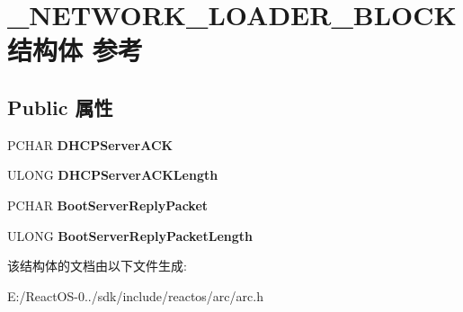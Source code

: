 \hypertarget{struct___n_e_t_w_o_r_k___l_o_a_d_e_r___b_l_o_c_k}{}\section{\+\_\+\+N\+E\+T\+W\+O\+R\+K\+\_\+\+L\+O\+A\+D\+E\+R\+\_\+\+B\+L\+O\+C\+K结构体 参考}
\label{struct___n_e_t_w_o_r_k___l_o_a_d_e_r___b_l_o_c_k}
\subsection*{Public 属性}
\begin{DoxyCompactItemize}
\item 
\mbox{\label{struct___n_e_t_w_o_r_k___l_o_a_d_e_r___b_l_o_c_k_aac56efba42e846c9dee97548af07b47d}} 
P\+C\+H\+AR {\bfseries D\+H\+C\+P\+Server\+A\+CK}
\item 
\mbox{\label{struct___n_e_t_w_o_r_k___l_o_a_d_e_r___b_l_o_c_k_aeed2e742fa4777b9906f6a4e18428448}} 
U\+L\+O\+NG {\bfseries D\+H\+C\+P\+Server\+A\+C\+K\+Length}
\item 
\mbox{\label{struct___n_e_t_w_o_r_k___l_o_a_d_e_r___b_l_o_c_k_a42128229d229ac47e88ab155e68bfb29}} 
P\+C\+H\+AR {\bfseries Boot\+Server\+Reply\+Packet}
\item 
\mbox{\label{struct___n_e_t_w_o_r_k___l_o_a_d_e_r___b_l_o_c_k_a979ddc4ea9287897a26d8451c7572673}} 
U\+L\+O\+NG {\bfseries Boot\+Server\+Reply\+Packet\+Length}
\end{DoxyCompactItemize}


该结构体的文档由以下文件生成\+:\begin{DoxyCompactItemize}
\item 
E\+:/\+React\+O\+S-\/0../sdk/include/reactos/arc/arc.\+h\end{DoxyCompactItemize}
